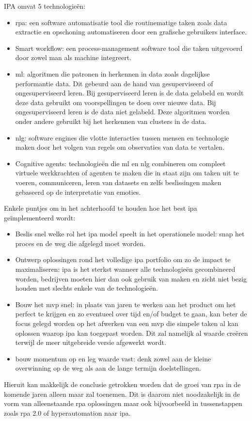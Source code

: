 IPA omvat 5 technologieën:
\begin{itemize}
	\item \acrshort{rpa}: een software automatisatie tool die routinematige taken zoals data extractie en opschoning automatiseren door een grafische gebruikers interface.
	\item Smart workflow: een process-management software tool die taken uitgevoerd door zowel man als machine integreert.
	\item  \acrshort{ml}: algoritmen die patronen in herkennen in data zoals dagelijkse performantie data. Dit gebeurd aan de hand van gesuperviseerd of ongesuperviseerd leren. Bij gesuperviseerd leren is de data gelabeld en wordt deze data gebruikt om voorspellingen te doen over nieuwe data. Bij ongesuperviseerd leren is de data niet gelabeld. Deze algoritmen worden onder andere gebruikt bij het herkennen van clusters in de data.
	\item  \acrshort{nlg}: software engines die vlotte interacties tussen mensen en technologie maken door het volgen van regels om observaties van data te vertalen.
	\item Cognitive agents: technologieën die  \acrshort{ml} en  \acrshort{nlg} combineren om compleet virtuele werkkrachten of agenten te maken die in staat zijn om taken uit te voeren, communiceren, leren van datasets en zelfs beslissingen maken gebaseerd op de interpretatie van emoties.
\end{itemize}

Enkele puntjes om in het achterhoofd te houden hoe het best  \acrshort{ipa} geïmplementeerd wordt:
\begin{itemize}
	\item Beslis snel welke rol het \acrshort{ipa} model speelt in het operationele model: snap het proces en de weg die afgelegd moet worden.
	\item Ontwerp oplossingen rond het volledige \acrshort{ipa} portfolio om zo de impact te maximaliseren: \acrshort{ipa} is het sterkst wanneer alle technologieën gecombineerd worden, bedrijven moeten hier dan ook gebruik van maken en zicht niet bezig houden met slechts enkele van de technologieën.
	\item Bouw het \acrfull{mvp} snel: in plaats van jaren te werken aan het product om het perfect te krijgen en zo eventueel over tijd en/of budget te gaan, kan beter de focus gelegd worden op het afwerken van een \acrshort{mvp} die simpele taken al kan oplossen waarop \acrshort{ipa} kan toegepast worden. Dit zal namelijk al waarde creëren terwijl de meer uitgebreide versie afgewerkt wordt.
	\item bouw momentum op en leg waarde vast: denk zowel aan de kleine overwinning op de weg als aan de  lange termijn doelstellingen.
\end{itemize} \autocite{everythingIPA}

Hieruit kan makkelijk de conclusie getrokken worden dat de groei van \acrshort{rpa} in de komende jaren alleen maar zal toenemen. Dit is daarom niet noodzakelijk in de vorm van alleenstaande \acrshort{rpa} oplossingen maar ook bijvoorbeeld in tussenstappen zoals \acrshort{rpa} 2.0 of hyperautomation naar \acrshort{ipa}.